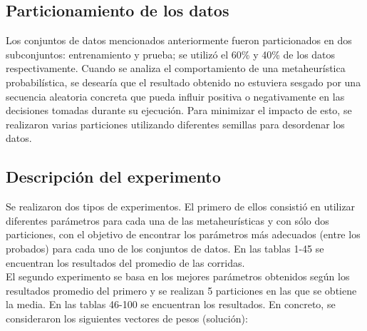 \documentclass{ci5652}
\begin{document}

\subsection{Particionamiento de los datos}

Los conjuntos de datos mencionados anteriormente fueron particionados en dos subconjuntos: entrenamiento y prueba; se utilizó el 60\% y 40\% de los datos respectivamente. Cuando se analiza el comportamiento de una metaheurística probabilística, se desearía que el resultado obtenido no estuviera sesgado por una secuencia aleatoria concreta que pueda influir positiva o negativamente en las decisiones tomadas durante su ejecución. Para minimizar el impacto de esto, se realizaron varias particiones utilizando diferentes semillas para desordenar los datos.


\subsection{Descripción del experimento}

Se realizaron dos tipos de experimentos. El primero de ellos consistió en utilizar diferentes parámetros para cada una de las metaheurísticas  y con sólo dos particiones, con el objetivo de encontrar los parámetros más adecuados (entre los probados) para cada uno de los conjuntos de datos. En las tablas 1-45 se encuentran los resultados del promedio de las corridas.\\

El segundo experimento se basa en los mejores parámetros obtenidos según los resultados promedio del primero y se realizan 5 particiones en las que se obtiene la media. En las tablas 46-100 se encuentran los resultados. En concreto, se consideraron los siguientes vectores de pesos (solución):
\end{document}
